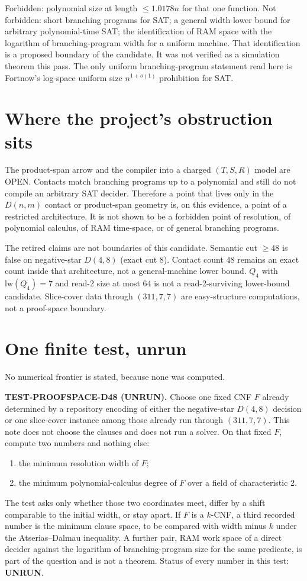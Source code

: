\documentclass[11pt]{article}
\begin{document}
Forbidden: polynomial size at length \(\le 1.0178n\) for that one function. Not forbidden: short branching programs for SAT; a general width lower bound for arbitrary polynomial-time SAT; the identification of RAM space with the logarithm of branching-program width for a uniform machine. That identification is a proposed boundary of the candidate. It was not verified as a simulation theorem this pass. The only uniform branching-program statement read here is Fortnow's log-space uniform size \(n^{1+o(1)}\) prohibition for SAT.

\section*{Where the project's obstruction sits}
The product-span arrow and the compiler into a charged \((T,S,R)\) model are OPEN. Contacts match branching programs up to a polynomial and still do not compile an arbitrary SAT decider. Therefore a point that lives only in the \(D(n,m)\) contact or product-span geometry is, on this evidence, a point of a restricted architecture. It is not shown to be a forbidden point of resolution, of polynomial calculus, of RAM time-space, or of general branching programs.

The retired claims are not boundaries of this candidate. Semantic cut \(\ge 48\) is false on negative-star \(D(4,8)\) (exact cut \(8\)). Contact count \(48\) remains an exact count inside that architecture, not a general-machine lower bound. \(Q_4\) with \(\mathrm{lw}(Q_4)=7\) and read-2 size at most \(64\) is not a read-2-surviving lower-bound candidate. Slice-cover data through \((311,7,7)\) are easy-structure computations, not a proof-space boundary.

\section*{One finite test, unrun}
No numerical frontier is stated, because none was computed.

\textbf{TEST-PROOFSPACE-D48 (UNRUN).}
Choose one fixed CNF \(F\) already determined by a repository encoding of either the negative-star \(D(4,8)\) decision or one slice-cover instance among those already run through \((311,7,7)\). This note does not choose the clauses and does not run a solver. On that fixed \(F\), compute two numbers and nothing else:
\begin{enumerate}
\item the minimum resolution width of \(F\);
\item the minimum polynomial-calculus degree of \(F\) over a field of characteristic 2.
\end{enumerate}
The test asks only whether those two coordinates meet, differ by a shift comparable to the initial width, or stay apart. If \(F\) is a \(k\)-CNF, a third recorded number is the minimum clause space, to be compared with width minus \(k\) under the Atserias--Dalmau inequality. A further pair, RAM work space of a direct decider against the logarithm of branching-program size for the same predicate, is part of the question and is not a theorem. Status of every number in this test: \textbf{UNRUN}.
\end{document}
